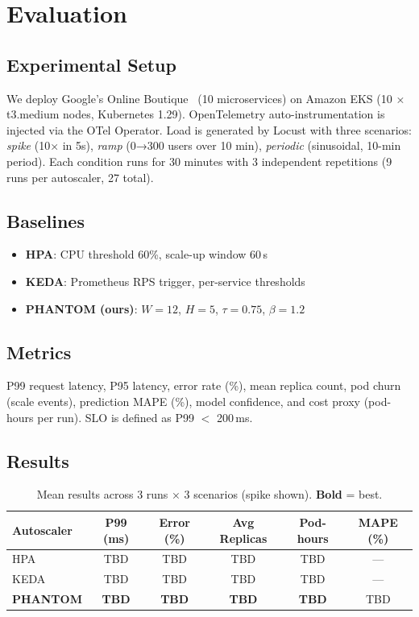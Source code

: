 \documentclass[sigconf,nonacm]{acmart}
\begin{document}
\section{Evaluation}

\subsection{Experimental Setup}
We deploy Google's Online Boutique~\cite{online-boutique} (10 microservices) on Amazon EKS (10 × t3.medium nodes, Kubernetes 1.29).
OpenTelemetry auto-instrumentation is injected via the OTel Operator.
Load is generated by Locust with three scenarios: \emph{spike} (10× in 5s), \emph{ramp} (0→300 users over 10 min), \emph{periodic} (sinusoidal, 10-min period).
Each condition runs for 30 minutes with 3 independent repetitions (9 runs per autoscaler, 27 total).

\subsection{Baselines}
\begin{itemize}
  \item \textbf{HPA}: CPU threshold 60\%, scale-up window 60\,s
  \item \textbf{KEDA}: Prometheus RPS trigger, per-service thresholds
  \item \textbf{PHANTOM (ours)}: $W=12$, $H=5$, $\tau=0.75$, $\beta=1.2$
\end{itemize}

\subsection{Metrics}
P99 request latency, P95 latency, error rate (\%), mean replica count, pod churn (scale events), prediction MAPE (\%), model confidence, and cost proxy (pod-hours per run).
SLO is defined as P99 $<$ 200\,ms.

\subsection{Results}

\begin{table}[h]
\caption{Mean results across 3 runs × 3 scenarios (spike shown). \textbf{Bold} = best.}
\label{tab:results}
\begin{tabular}{lccccc}
\toprule
Autoscaler & P99 (ms) & Error (\%) & Avg Replicas & Pod-hours & MAPE (\%) \\
\midrule
HPA        & TBD & TBD & TBD & TBD & --- \\
KEDA       & TBD & TBD & TBD & TBD & --- \\
\textbf{PHANTOM} & \textbf{TBD} & \textbf{TBD} & \textbf{TBD} & \textbf{TBD} & TBD \\
\bottomrule
\end{tabular}
\end{table}
\end{document}
